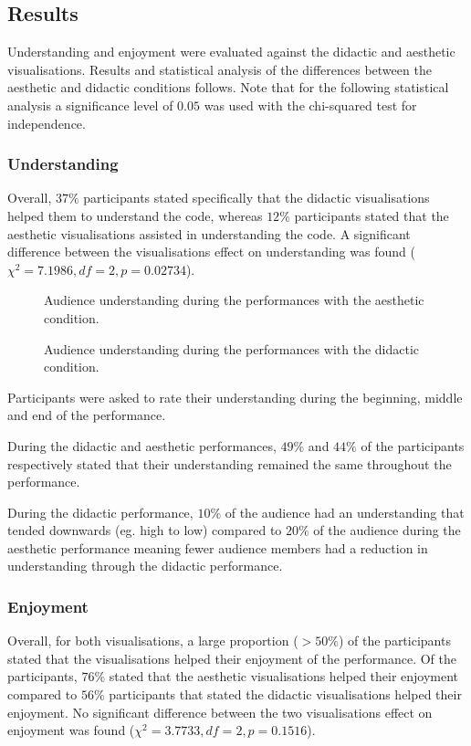 \documentclass{sig-alternate}
\begin{document}
\subsection{Results}

Understanding and enjoyment were evaluated against the didactic and aesthetic visualisations. Results and statistical analysis of the differences between the aesthetic and didactic conditions follows. Note that for the following statistical analysis a significance level of $0.05$ was used with the chi-squared test for independence.

\subsubsection{Understanding}

Overall, $37\%$ participants stated specifically that the didactic visualisations helped them to understand the code, whereas $12\%$ participants stated that the aesthetic visualisations assisted in understanding the code. A significant difference between the visualisations effect on understanding was found ($\chi^2=7.1986,df=2,p=0.02734$).

\begin{figure}
\centering
{}
\caption{Audience understanding during the performances with the aesthetic condition.}
\end{figure}

\begin{figure}
\centering
{}
\caption{Audience understanding during the performances with the didactic condition.}
\end{figure}

Participants were asked to rate their understanding during the beginning, middle and end of the performance.

During the didactic and aesthetic performances, $49\%$ and $44\%$ of the participants respectively stated that their understanding remained the same throughout the performance.

During the didactic performance, $10\%$ of the audience had an understanding that tended downwards (eg. high to low) compared to $20\%$ of the audience during the aesthetic performance meaning fewer audience members had a reduction in understanding through the didactic performance.

\subsubsection{Enjoyment}
Overall, for both visualisations, a large proportion ($> 50\%$) of the participants stated that the visualisations helped their enjoyment of the performance. Of the participants, $76\%$ stated that the aesthetic visualisations helped their enjoyment compared to $56\%$ participants that stated the didactic visualisations helped their enjoyment. No significant difference between the two visualisations effect on enjoyment was found ($\chi^2=3.7733,df=2,p=0.1516$).
\end{document}
